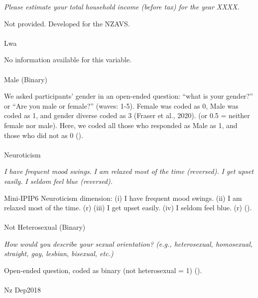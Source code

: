 \documentclass[
  single column]{article}
\makeatletter
\let\oldparagraph\paragraph
\renewcommand{\paragraph}{
    \@ifstar
      \xxxParagraphStar
      \xxxParagraphNoStar
  }
\newcommand{\xxxParagraphStar}[1]{\oldparagraph*{#1}\mbox{}}
\newcommand{\xxxParagraphNoStar}[1]{\oldparagraph{#1}\mbox{}}
\makeatother
\begin{document}
\emph{Please estimate your total household income (before tax) for the
year XXXX.}

Not provided. Developed for the NZAVS.

\paragraph{Lwa}\label{lwa}

No information available for this variable.

\paragraph{Male (Binary)}\label{male-binary}

We asked participants' gender in an open-ended question: ``what is your
gender?'' or ``Are you male or female?'' (waves: 1-5). Female was coded
as 0, Male was coded as 1, and gender diverse coded as 3 (Fraser et al.,
2020). (or 0.5 = neither female nor male). Here, we coded all those who
responded as Male as 1, and those who did not as 0
().

\paragraph{Neuroticism}\label{neuroticism}

\emph{I have frequent mood swings.} \emph{I am relaxed most of the time
(reversed).} \emph{I get upset easily.} \emph{I seldom feel blue
(reversed).}

Mini-IPIP6 Neuroticism dimension: (i) I have frequent mood swings. (ii)
I am relaxed most of the time. (r) (iii) I get upset easily. (iv) I
seldom feel blue. (r) ().

\paragraph{Not Heterosexual (Binary)}\label{not-heterosexual-binary}

\emph{How would you describe your sexual orientation? (e.g.,
heterosexual, homosexual, straight, gay, lesbian, bisexual, etc.)}

Open-ended question, coded as binary (not heterosexual = 1)
().

\paragraph{Nz Dep2018}\label{nz-dep2018}
\end{document}
